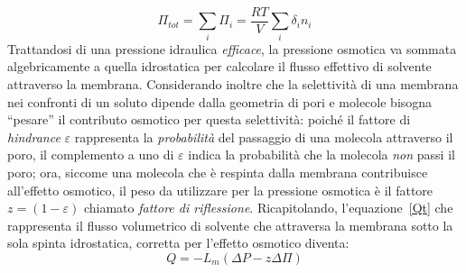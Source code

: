 $$ \Pi_{tot} = \sum_i{\Pi_i} = \frac{RT}{V} \sum_i{\delta_i n_i}$$
\newline
Trattandosi di una pressione idraulica \textit{efficace}, la pressione osmotica va sommata algebricamente a quella idrostatica per calcolare il flusso effettivo di solvente attraverso la membrana. Considerando inoltre che la selettività di una membrana nei confronti di un soluto dipende dalla geometria di pori e molecole bisogna ``pesare'' il contributo osmotico per questa selettività: poiché il fattore di \textit{hindrance} $\varepsilon$ rappresenta la \textit{probabilità} del passaggio di una molecola attraverso il poro, il complemento a uno di $\varepsilon$ indica la probabilità che la molecola \textit{non} passi il poro; ora, siccome una molecola che è respinta dalla membrana contribuisce all'effetto osmotico, il peso da utilizzare per la pressione osmotica è il fattore $z = (1-\varepsilon)$ chiamato \textit{fattore di riflessione}. Ricapitolando, l'equazione~\ref{Qt} che rappresenta il flusso volumetrico di solvente che attraversa la membrana sotto la sola spinta idrostatica, corretta per l'effetto osmotico diventa:
\begin{equation}\label{Qtpi}
	Q = -L_m (\Delta P - z\Delta\Pi)
\end{equation}


